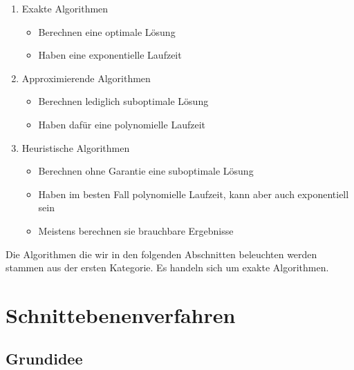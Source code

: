 \documentclass[tog]{acmsiggraph}
\begin{document}
\begin{enumerate}
\item Exakte Algorithmen
\begin{itemize}
\item Berechnen eine optimale Lösung
\item Haben eine exponentielle Laufzeit
\end{itemize}
\item Approximierende Algorithmen
\begin{itemize}
\item Berechnen lediglich suboptimale Lösung
\item Haben dafür eine polynomielle Laufzeit
\end{itemize}
\item Heuristische Algorithmen
\begin{itemize}
\item Berechnen ohne Garantie eine suboptimale Lösung
\item Haben im besten Fall polynomielle Laufzeit, kann aber auch exponentiell sein
\item Meistens berechnen sie brauchbare Ergebnisse
\end{itemize}
\end{enumerate}

Die Algorithmen die wir in den folgenden Abschnitten beleuchten werden stammen aus der ersten Kategorie. Es handeln sich um exakte Algorithmen. 

\section{Schnittebenenverfahren}

\subsection*{Grundidee}
\end{document}

